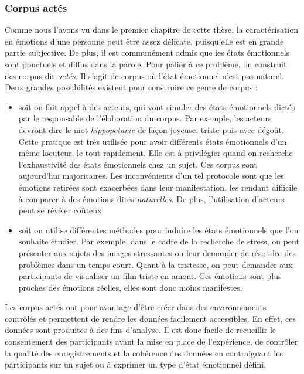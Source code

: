 \subsubsection{Corpus actés}
Comme nous l'avons vu dans le premier chapitre de cette thèse, la caractérisation en émotions d'une personne peut être assez délicate, puisqu'elle est en grande partie subjective. De plus, il est communément admis que les états émotionnels sont ponctuels et diffus dans la parole. Pour palier à ce problème, on construit des corpus dit \textit{actés}. Il s'agit de corpus où l'état émotionnel n'est pas naturel. Deux grandes possibilités existent pour construire ce genre de corpus :
\begin{itemize}
  \item soit on fait appel à des acteurs, qui vont simuler des états émotionnels dictés par le responsable de l'élaboration du corpus. Par exemple, les acteurs devront dire le mot \textit{hippopotame} de façon joyeuse, triste puis avec dégoût. Cette pratique est très utilisée pour avoir différents états émotionnels d'un même locuteur, le tout rapidement. Elle est à privilégier quand on recherche l'exhaustivité des états émotionnels chez un sujet. Ces corpus sont aujourd'hui majoritaires. Les inconvénients d'un tel protocole sont que les émotions retirées sont exacerbées dans leur manifestation, les rendant difficile à comparer à des émotions dites \textit{naturelles}. De plus, l'utilisation d'acteurs peut se révéler coûteux.
  \item soit on utilise différentes méthodes pour induire les états émotionnels que l'on souhaite étudier. Par exemple, dans le cadre de la recherche de stress, on peut présenter aux sujets des images stressantes ou leur demander de résoudre des problèmes dans un temps court. Quant à la tristesse, on peut demander aux participants de visualiser un film triste en amont. Ces émotions sont plus proches des émotions réelles, elles sont donc moins manifestes.
\end{itemize}

Les corpus actés ont pour avantage d'être créer dans des environnements contrôlés et permettent de rendre les données facilement accessibles. En effet, ces données sont produites à des fins d'analyse. Il est donc facile de recueillir le consentement des participants avant la mise en place de l'expérience, de contrôler la qualité des enregistrements et la cohérence des données en contraignant les participants sur un sujet ou à exprimer un type d'état émotionnel défini.

